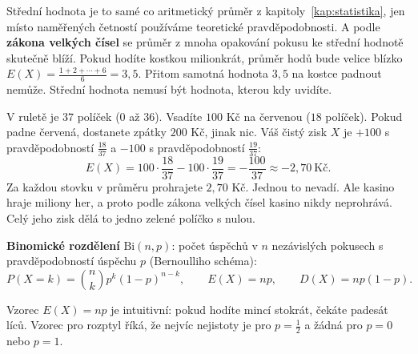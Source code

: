 Střední hodnota je to samé co aritmetický průměr z kapitoly~\ref{kap:statistika}, jen místo naměřených četností používáme teoretické pravděpodobnosti. A podle \textbf{zákona velkých čísel} se průměr z mnoha opakování pokusu ke střední hodnotě skutečně blíží. Pokud hodíte kostkou milionkrát, průměr hodů bude velice blízko $E(X) = \frac{1 + 2 + \cdots + 6}{6} = 3{,}5$. Přitom samotná hodnota $3{,}5$ na kostce padnout nemůže. Střední hodnota nemusí být hodnota, kterou kdy uvidíte.

\begin{example}
  V ruletě je $37$ políček ($0$ až $36$). Vsadíte $100$ Kč na červenou ($18$ políček). Pokud padne červená, dostanete zpátky $200$ Kč, jinak nic. Váš čistý zisk $X$ je $+100$ s pravděpodobností $\frac{18}{37}$ a $-100$ s pravděpodobností $\frac{19}{37}$:
  \begin{equation*}
    E(X) = 100\cdot\frac{18}{37} - 100\cdot\frac{19}{37} = -\frac{100}{37}\approx -2{,}70\ \text{Kč}.
  \end{equation*}
  Za každou stovku v průměru prohrajete $2{,}70$ Kč. Jednou to nevadí. Ale kasino hraje miliony her, a proto podle zákona velkých čísel kasino nikdy neprohrává. Celý jeho zisk dělá to jedno zelené políčko s nulou.
\end{example}

\begin{definitionbox}
  \textbf{Binomické rozdělení} $\mathrm{Bi}(n, p)$: počet úspěchů v $n$ nezávislých pokusech s pravděpodobností úspěchu $p$ (Bernoulliho schéma):
  \begin{equation*}
    P(X = k) = \binom{n}{k}p^k{(1 - p)}^{n - k},\qquad E(X) = np,\qquad D(X) = np(1 - p).
  \end{equation*}
\end{definitionbox}

Vzorec $E(X) = np$ je intuitivní: pokud hodíte mincí stokrát, čekáte padesát líců. Vzorec pro rozptyl říká, že nejvíc nejistoty je pro $p = \frac{1}{2}$ a žádná pro $p = 0$ nebo $p = 1$.

\begin{center}
\end{center}


